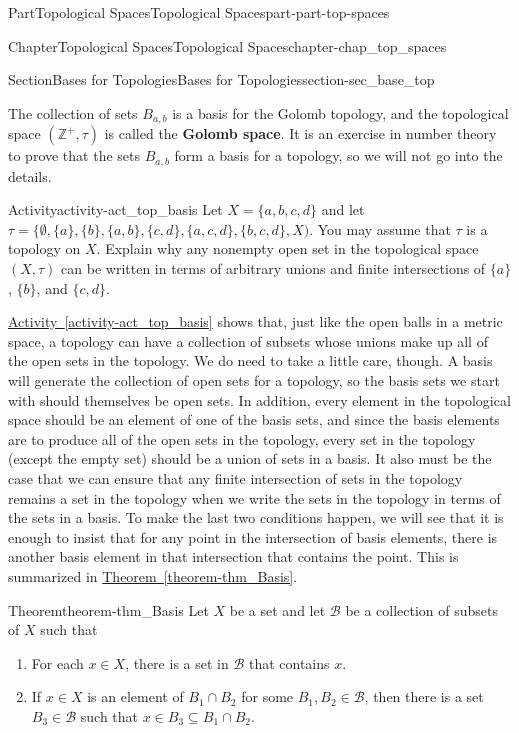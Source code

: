 \documentclass[oneside,10pt,]{book}
\newcommand{\xreffont}{\relax}
\newcommand{\terminology}[1]{\textbf{#1}}
\numberwithin{equation}{chapter}
\newcommand{\Z}{\mathbb{Z}}
\newcommand{\B}{\mathcal{B}}
\begin{document}
\begin{partptx}{Part}{Topological Spaces}{}{Topological Spaces}{}{}{part-part-top-spaces}
\begin{chapterptx}{Chapter}{Topological Spaces}{}{Topological Spaces}{}{}{chapter-chap_top_spaces}
\begin{sectionptx}{Section}{Bases for Topologies}{}{Bases for Topologies}{}{}{section-sec_base_top}
\begin{equation*}
\end{equation*}
%
\par
{} The collection of sets \(B_{a,b}\) is a basis for the Golomb topology, and the topological space \((\Z^+, \tau)\) is called the \terminology{Golomb space}. It is an exercise in number theory to prove that the sets \(B_{a,b}\) form a basis for a topology, so we will not go into the details.%
\begin{activity}{Activity}{}{activity-act_top_basis}%
Let \(X = \{a,b,c,d\}\) and let \(\tau = \{\emptyset, \{a\}, \{b\}, \{a,b\}, \{c,d\}, \{a,c,d\}, \{b,c,d\},X)\). You may assume that \(\tau\) is a topology on \(X\). Explain why any nonempty open set in the topological space \((X, \tau)\) can be written in terms of arbitrary unions and finite intersections of \(\{a\}\), \(\{b\}\), and \(\{c,d\}\).%
\end{activity}%
\hyperref[activity-act_top_basis]{Activity~{\xreffont\ref{activity-act_top_basis}}} shows that, just like the open balls in a metric space, a topology can have a collection of subsets whose unions make up all of the open sets in the topology. We do need to take a little care, though. A basis will generate the collection of open sets for a topology, so the basis sets we start with should themselves be open sets. In addition, every element in the topological space should be an element of one of the basis sets, and since the basis elements are to produce all of the open sets in the topology, every set in the topology (except the empty set) should be a union of sets in a basis. It also must be the case that we can ensure that any finite intersection of sets in the topology remains a set in the topology when we write the sets in the topology in terms of the sets in a basis. To make the last two conditions happen, we will see that it is enough to insist that for any point in the intersection of basis elements, there is another basis element in that intersection that contains the point. This is summarized in \hyperref[theorem-thm_Basis]{Theorem~{\xreffont\ref{theorem-thm_Basis}}}.%
\begin{theorem}{Theorem}{}{}{theorem-thm_Basis}%
Let \(X\) be a set and let \(\B\) be a collection of subsets of \(X\) such that%
\begin{enumerate}
\item{}For each \(x \in X\), there is a set in \(\B\) that contains \(x\).%
\item{}If \(x \in X\) is an element of \(B_1 \cap B_2\) for some \(B_1, B_2 \in \B\), then there is a set \(B_3 \in \B\) such that \(x \in B_3 \subseteq B_1 \cap B_2\).%

\end{enumerate}
\end{theorem}
\end{sectionptx}
\end{chapterptx}
\end{partptx}
\end{document}
